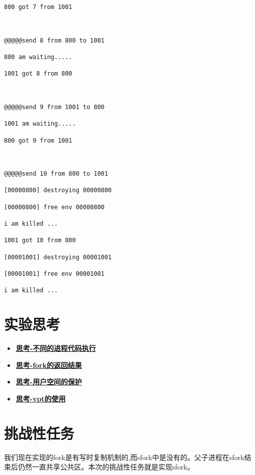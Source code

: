 \begin{verbatim}
800 got 7 from 1001



@@@@@send 8 from 800 to 1001

800 am waiting.....

1001 got 8 from 800



@@@@@send 9 from 1001 to 800

1001 am waiting.....

800 got 9 from 1001



@@@@@send 10 from 800 to 1001

[00000800] destroying 00000800

[00000800] free env 00000800

i am killed ...

1001 got 10 from 800

[00001001] destroying 00001001

[00001001] free env 00001001

i am killed ...

\end{verbatim}

\section{实验思考}

\begin{itemize}
	\item \hyperref[think-father-son]{\textbf{\textcolor{baseB}{思考-不同的进程代码执行}}}
	\item \hyperref[think-fork的调用]{\textbf{\textcolor{baseB}{思考-fork的返回结果}}}
	\item \hyperref[think:遍历页]{\textbf{\textcolor{baseB}{思考-用户空间的保护}}}
	\item \hyperref[think:vpt的使用]{\textbf{\textcolor{baseB}{思考-vpt的使用}}}
\end{itemize}

\section{挑战性任务}

我们现在实现的fork是有写时复制机制的,而sfork中是没有的。父子进程在sfork结束后仍然一直共享公共区。本次的挑战性任务就是实现sfork。

